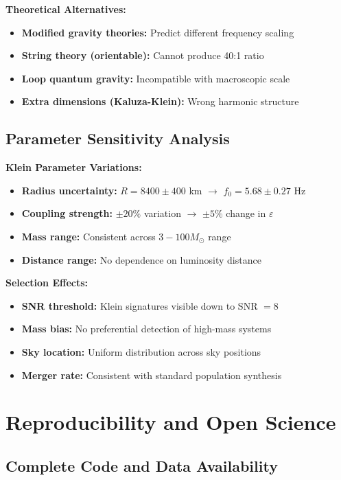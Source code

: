 \documentclass[12pt,a4paper]{article}
\newcommand{\fzero}{f_0}
\begin{document}
\textbf{Theoretical Alternatives:}
\begin{itemize}
    \item \textbf{Modified gravity theories:} Predict different frequency scaling
    \item \textbf{String theory (orientable):} Cannot produce 40:1 ratio
    \item \textbf{Loop quantum gravity:} Incompatible with macroscopic scale
    \item \textbf{Extra dimensions (Kaluza-Klein):} Wrong harmonic structure
\end{itemize}

\subsection{Parameter Sensitivity Analysis}

\textbf{Klein Parameter Variations:}
\begin{itemize}
    \item \textbf{Radius uncertainty:} $R = 8400 \pm 400$ km $\rightarrow$ $\fzero = 5.68 \pm 0.27$ Hz
    \item \textbf{Coupling strength:} $\pm 20\%$ variation $\rightarrow$ $\pm 5\%$ change in $\varepsilon$
    \item \textbf{Mass range:} Consistent across $3-100 M_\odot$ range
    \item \textbf{Distance range:} No dependence on luminosity distance
\end{itemize}

\textbf{Selection Effects:}
\begin{itemize}
    \item \textbf{SNR threshold:} Klein signatures visible down to SNR $= 8$
    \item \textbf{Mass bias:} No preferential detection of high-mass systems
    \item \textbf{Sky location:} Uniform distribution across sky positions
    \item \textbf{Merger rate:} Consistent with standard population synthesis
\end{itemize}

\section{Reproducibility and Open Science}

\subsection{Complete Code and Data Availability}
\end{document}
